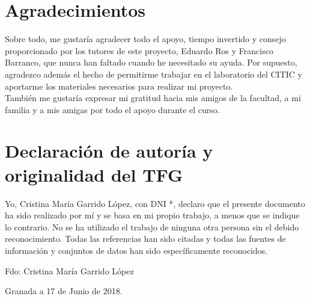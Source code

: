 \section*{Agradecimientos}
\thispagestyle{empty}

       \vspace{1cm}


\noindent Sobre todo, me gustaría agradecer todo el apoyo, tiempo invertido y consejo proporcionado por los tutores de este proyecto, Eduardo Ros y Francisco Barranco, que nunca han faltado cuando he necesitado su ayuda. Por supuesto, agradezco además el hecho de permitirme trabajar en el laboratorio del CITIC y aportarme los materiales necesarios para realizar mi proyecto. \\

\noindent También me gustaría expresar mi gratitud hacia mis amigos de la facultad, a mi familia y a mis amigas por todo el apoyo durante el curso.\\


\newpage
\section*{Declaración de autoría y originalidad del TFG}

\vspace{1cm}

\noindent Yo, Cristina María Garrido López, con DNI *, declaro que el presente documento ha sido realizado por mí y se basa en mi propio trabajo, a menos que se indique lo contrario. No se ha utilizado el trabajo de ninguna otra persona sin el debido reconocimiento. Todas las referencias han sido citadas y todas las fuentes de información y conjuntos de datos han sido específicamente reconocidos. \\

\vspace{6cm}

\noindent Fdo: Cristina María Garrido López

\vspace{2cm}

\begin{flushright}
	Granada a 17 de Junio de 2018.
\end{flushright}
